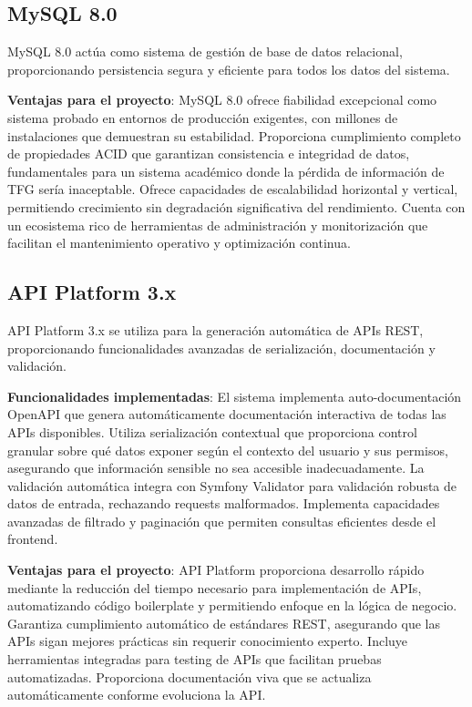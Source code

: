 \documentclass[12pt,a4paper,oneside]{report}
\begin{document}
\subsection{MySQL 8.0}\label{mysql-8.0}

MySQL 8.0 actúa como sistema de gestión de base de datos relacional,
proporcionando persistencia segura y eficiente para todos los datos del
sistema.

\textbf{Ventajas para el proyecto}: MySQL 8.0 ofrece fiabilidad excepcional como sistema probado en entornos de producción exigentes, con millones de instalaciones que demuestran su estabilidad. Proporciona cumplimiento completo de propiedades ACID que garantizan consistencia e integridad de datos, fundamentales para un sistema académico donde la pérdida de información de TFG sería inaceptable. Ofrece capacidades de escalabilidad horizontal y vertical, permitiendo crecimiento sin degradación significativa del rendimiento. Cuenta con un ecosistema rico de herramientas de administración y monitorización que facilitan el mantenimiento operativo y optimización continua.

\subsection{API Platform 3.x}\label{api-platform-3.x}

API Platform 3.x se utiliza para la generación automática de APIs REST,
proporcionando funcionalidades avanzadas de serialización, documentación
y validación.

\textbf{Funcionalidades implementadas}: El sistema implementa auto-documentación OpenAPI que genera automáticamente documentación interactiva de todas las APIs disponibles. Utiliza serialización contextual que proporciona control granular sobre qué datos exponer según el contexto del usuario y sus permisos, asegurando que información sensible no sea accesible inadecuadamente. La validación automática integra con Symfony Validator para validación robusta de datos de entrada, rechazando requests malformados. Implementa capacidades avanzadas de filtrado y paginación que permiten consultas eficientes desde el frontend.

\textbf{Ventajas para el proyecto}: API Platform proporciona desarrollo rápido mediante la reducción del tiempo necesario para implementación de APIs, automatizando código boilerplate y permitiendo enfoque en la lógica de negocio. Garantiza cumplimiento automático de estándares REST, asegurando que las APIs sigan mejores prácticas sin requerir conocimiento experto. Incluye herramientas integradas para testing de APIs que facilitan pruebas automatizadas. Proporciona documentación viva que se actualiza automáticamente conforme evoluciona la API.
\end{document}
